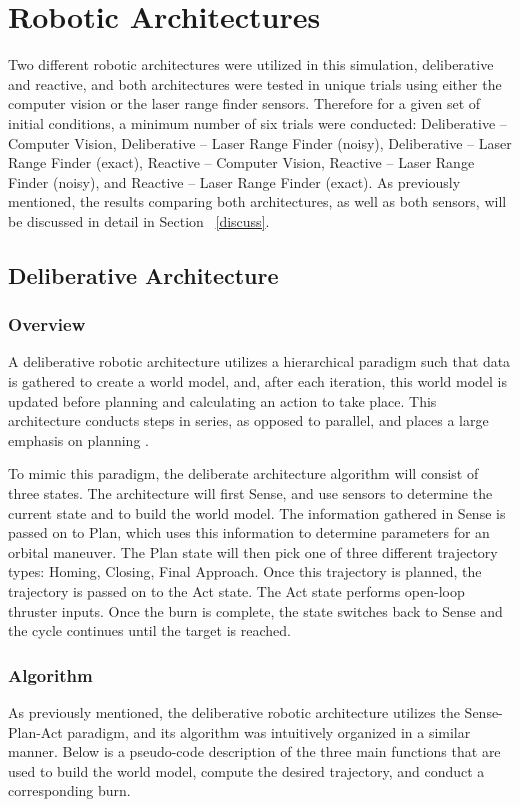 \documentclass[journal, 10pt]{IEEEtran}
\begin{document}
\section{Robotic Architectures}
Two different robotic architectures were utilized in this simulation, deliberative and reactive, and both architectures were tested in unique trials using either the computer vision or the laser range finder sensors. Therefore for a given set of initial conditions, a minimum number of six trials were conducted: Deliberative -- Computer Vision, Deliberative -- Laser Range Finder (noisy), Deliberative -- Laser Range Finder (exact), Reactive -- Computer Vision, Reactive -- Laser Range Finder (noisy), and Reactive -- Laser Range Finder (exact). As previously mentioned, the results comparing both architectures, as well as both sensors, will be discussed in detail in Section ~\ref{discuss}.

\subsection{Deliberative Architecture}
\subsubsection{Overview}
A deliberative robotic architecture utilizes a hierarchical paradigm such that data is gathered to create a world model, and, after each iteration, this world model is updated before planning and calculating an action to take place. This architecture conducts steps in series, as opposed to parallel, and places a large emphasis on planning \cite{joshi}.

To mimic this paradigm, the deliberate architecture algorithm will consist of three states. The architecture will first Sense, and use sensors to determine the current state and to build the world model. The information gathered in Sense is passed on to Plan, which uses this information to determine parameters for an orbital maneuver. The Plan state will then pick one of three different trajectory types: Homing, Closing, Final Approach. Once this trajectory is planned, the trajectory is passed on to the Act state. The Act state performs open-loop thruster inputs. Once the burn is complete, the state switches back to Sense and the cycle continues until the target is reached.

\subsubsection{Algorithm}
As previously mentioned, the deliberative robotic architecture utilizes the Sense-Plan-Act paradigm, and its algorithm was intuitively organized in a similar manner. Below is a pseudo-code description of the three main functions that are used to build the world model, compute the desired trajectory, and conduct a corresponding burn. 
\end{document}
